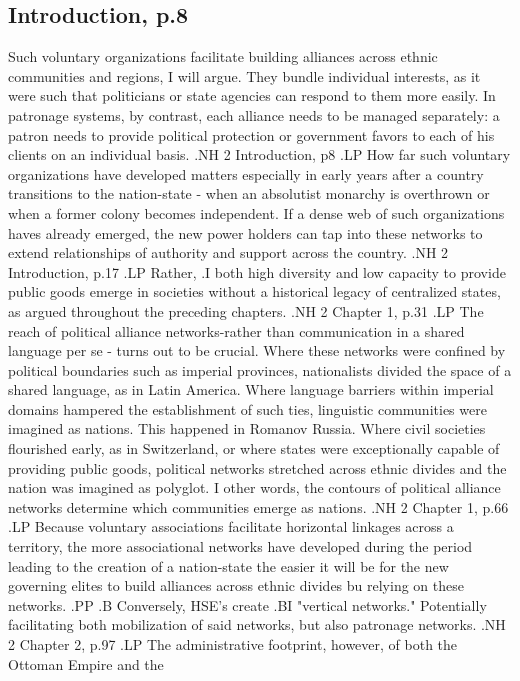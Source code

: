 \documentclass[12pt]{article}
\begin{document}
\subsection{Introduction, p.8}
Such voluntary organizations facilitate building alliances across ethnic
communities and regions, I will argue.  They bundle individual interests, as it
were such that politicians or state agencies can respond to them more easily.
In patronage systems, by contrast, each alliance needs to be managed separately:
a patron needs to provide political protection or government favors to each of
his clients on an individual basis.
.NH 2
Introduction, p8
.LP
How far such voluntary organizations have developed matters especially in early
years after a country transitions to the nation-state - when an absolutist
monarchy is overthrown or when a former colony becomes independent.  If a dense
web of such organizations haves already emerged, the new power holders can tap
into these networks to extend relationships of authority and support across the
country. 
.NH 2
Introduction, p.17
.LP
Rather, .I both high diversity and low capacity to provide public goods emerge
in societies without a historical legacy of centralized states, as argued
throughout the preceding chapters.
.NH 2
Chapter 1, p.31
.LP
The reach of political alliance networks-rather than communication in a shared
language per se - turns out to be crucial.  Where these networks were confined
by political boundaries such as imperial provinces, nationalists divided the
space of a shared language, as in Latin America.  Where language barriers within
imperial domains hampered the establishment of such ties, linguistic communities
were imagined as nations.  This happened in Romanov Russia.  Where civil
societies flourished early, as in Switzerland, or where states were
exceptionally capable of providing public goods, political networks stretched
across ethnic divides and the nation was imagined as polyglot.  I other words,
the contours of political alliance networks determine which communities emerge
as nations.
.NH 2
Chapter 1, p.66
.LP
Because voluntary associations facilitate horizontal linkages across a
territory, the more associational networks have developed during the period
leading to the creation of a nation-state the easier it will be for the new
governing elites to build alliances across ethnic divides bu relying on these
networks.
.PP
.B 
Conversely, HSE's create 
.BI "vertical networks."
Potentially facilitating both mobilization of said networks, but also patronage
networks.
.NH 2 
Chapter 2, p.97
.LP
The administrative footprint, however, of both the Ottoman Empire and the
\end{document}
